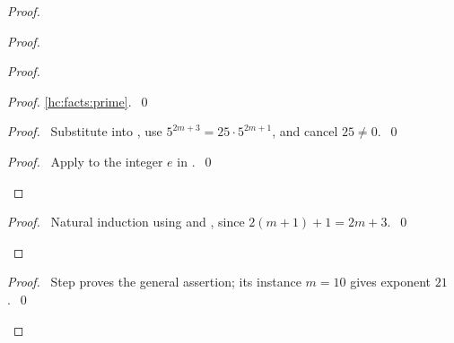 \begin{mergedproofsection}
\begin{proof}
\begin{proof}
\begin{proof}
\begin{proof}
    \ref{hc:facts:prime}.~\qed\end{proof}
   \begin{proof}\pf\ Substitute  into
    , use $5^{2m+3}=25\cdot5^{2m+1}$, and cancel $25\ne0$.~\qed\end{proof}
   \qedstep
   \begin{proof}\pf\ Apply  to the integer $e$ in
    .~\qed\end{proof}
  \end{proof}
  \qedstep
  \begin{proof}\pf\ Natural induction using  and
   , since $2(m+1)+1=2m+3$.~\qed\end{proof}
 \end{proof}
 \qedstep
 \begin{proof}\pf\ Step  proves the general assertion;
  its instance $m=10$ gives exponent $21$.~\qed\end{proof}
\end{proof}


\end{mergedproofsection}
